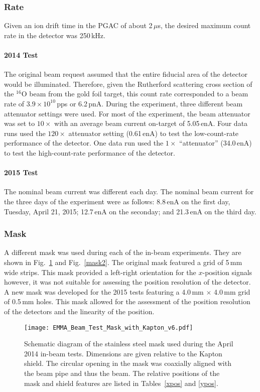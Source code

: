 \subsubsection{Rate}
Given an ion drift time in the PGAC of about 2\,$\mu$s, the desired maximum count rate in the detector was 250\,kHz.
\paragraph{2014 Test}The original beam request assumed that the entire fiducial area of the detector would be illuminated.  Therefore, given the Rutherford scattering cross section of the $^{16}$O beam from the gold foil target, this count rate corresponded to a beam rate of $3.9 \times 10^{10}$\,pps or 6.2\,pnA. During the experiment, three different beam attenuator settings were used.  For most of the experiment, the beam attenuator was set to $10\times$ with an average beam current on-target of 5.05\,enA. Four data runs used the $120\times$ attenuator setting (0.61\,enA) to test the low-count-rate performance of the detector. One data run used the $1\times$ ``attenuator'' (34.0\,enA) to test the high-count-rate performance of the detector.
\paragraph{2015 Test}
The nominal beam current was different each day. The nominal beam current for the three days of the experiment were as follows: 8.8\,enA on the first day, Tuesday, April 21, 2015; 12.7\,enA on the seconday; and  21.3\,enA on the third day.

\subsubsection{Mask}
A different mask was used during each of the in-beam experiments. They are shown in Fig.~\ref{mask} and Fig.~\ref{mask2}. The original mask featured a grid of 5\,mm wide strips. This mask provided a left-right orientation for the $x$-position signals however, it was not suitable for assessing the position resolution of the detector.
A new mask was developed for the 2015 tests featuring a 4.0\,mm $\times$ 4.0\,mm grid of 0.5\,mm holes. This mask allowed for the assessment of the position resolution of the detectors and the linearity of the position.

\begin{figure}
\centering
\texttt{[image: EMMA\_Beam\_Test\_Mask\_with\_Kapton\_v6.pdf]}
\caption{Schematic diagram of the stainless steel mask used during the April 2014 in-beam tests. Dimensions are given relative to the Kapton shield.  The circular opening in the mask was coaxially aligned with the beam pipe and thus the beam.  The relative positions of the mask and shield features are listed in Tables~\ref{xpos} and \ref{ypos}.}%
\label{mask}%
\end{figure}

